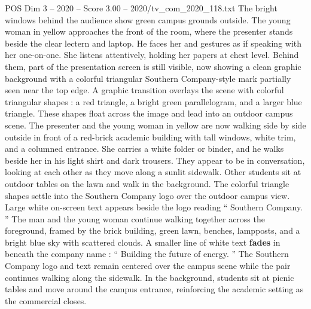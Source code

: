 \begin{textsample}{POS Dim 3 – 2020 – Score 3.00 – 2020/tv\_com\_2020\_118.txt}
The bright windows behind the audience show green campus grounds outside.
The young woman in yellow approaches the front of the room, where the presenter stands beside the clear lectern and laptop.
He faces her and gestures as if speaking with her one-on-one.
She listens attentively, holding her papers at chest level.
Behind them, part of the presentation screen is still visible, now showing a clean graphic background with a colorful triangular Southern Company-style mark partially seen near the top edge.
A graphic transition overlays the scene with colorful triangular shapes : a red triangle, a bright green parallelogram, and a larger blue triangle.
These shapes float across the image and lead into an outdoor campus scene.
The presenter and the young woman in yellow are now walking side by side outside in front of a red-brick academic building with tall windows, white trim, and a columned entrance.
She carries a white folder or binder, and he walks beside her in his light shirt and dark trousers.
They appear to be in conversation, looking at each other as they move along a sunlit sidewalk.
Other students sit at outdoor tables on the lawn and walk in the background.
The colorful triangle shapes settle into the Southern Company logo over the outdoor campus view.
Large white on-screen text appears beside the logo reading “ Southern Company. ” The man and the young woman continue walking together across the foreground, framed by the brick building, green lawn, benches, lampposts, and a bright blue sky with scattered clouds.
A smaller line of white text \textbf{fades} in beneath the company name : “ Building the future of energy. ” The Southern Company logo and text remain centered over the campus scene while the pair continues walking along the sidewalk.
In the background, students sit at picnic tables and move around the campus entrance, reinforcing the academic setting as the commercial closes.

\end{textsample}
